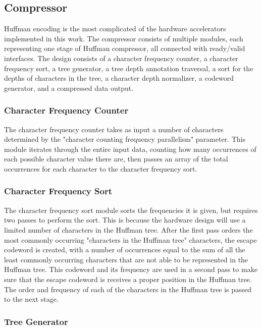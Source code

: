 \documentclass[doublespace,draft,nopageskip]{VTthesis} %
\begin{document}
\subsection{Compressor}\label{ss:huffman_hardware_compressor}
Huffman encoding is the most complicated of the hardware accelerators implemented in this work. The compressor consists of multiple modules, each representing one stage of Huffman compressor, all connected with ready/valid interfaces. The design consists of a character frequency counter, a character frequency sort, a tree generator, a tree depth annotation traversal, a sort for the depths of characters in the tree, a character depth normalizer, a codeword generator, and a compressed data output.

\subsubsection{Character Frequency Counter}\label{sss:character_frequency_counter}
The character frequency counter takes as input a number of characters determined by the "character counting frequency parallelism" parameter. This module iterates through the entire input data, counting how many occurrences of each possible character value there are, then passes an array of the total occurrences for each character to the character frequency sort.

\subsubsection{Character Frequency Sort}\label{sss:character_frequency_sort}
The character frequency sort module sorts the frequencies it is given, but requires two passes to perform the sort. This is because the hardware design will use a limited number of characters in the Huffman tree. After the first pass orders the most commonly occurring "characters in the Huffman tree" characters, the escape codeword is created, with a number of occurrences equal to the sum of all the least commonly occurring characters that are not able to be represented in the Huffman tree. This codeword and its frequency are used in a second pass to make sure that the escape codeword is receives a proper position in the Huffman tree. The order and frequency of each of the characters in the Huffman tree is passed to the next stage.

\subsubsection{Tree Generator}\label{sss:tree_generator}
\end{document}
